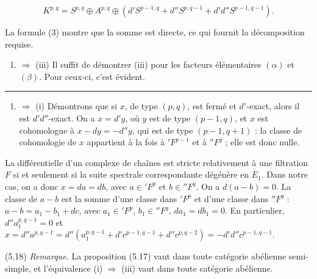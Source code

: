 \documentclass[
  french,
  a3paper,
  a3paper]{extarticle}
\providecommand{\tightlist}{%
  \setlength{\itemsep}{0pt}\setlength{\parskip}{0pt}}
\begin{document}
\[K^{p,q}=S^{p,q}\oplus A^{p,q}\oplus(d'S^{p-1,q}+d''S^{p,q-1}+d'd''S^{p-1,q-1}).\]

La formule (3) montre que la somme est directe, ce qui fournit la
décomposition requise.

\begin{enumerate}
\def\labelenumi{(\roman{enumi})}
\setcounter{enumi}{1}
\tightlist
\item
  \(\Rightarrow\) (iii) Il suffit de démontrer (iii) pour les facteurs
  élémentaires \((\alpha)\) et \((\beta)\). Pour ceux-ci, c'est évident.
\end{enumerate}

\clearpage



\par

\vspace{0.7mm}\hrule\vspace{1.6mm}

\fontsize{9}{11}\selectfont

\begin{enumerate}
\def\labelenumi{(\roman{enumi})}
\setcounter{enumi}{2}
\tightlist
\item
  \(\Rightarrow\) (i) Démontrons que si \(x\), de type \((p,q)\), est
  fermé et \(d'\)-exact, alors il est \(d'd''\)-exact. On a \(x=d'y\),
  où \(y\) est de type \((p-1,q)\), et \(x\) est cohomologue à
  \(x-dy=-d''y\), qui est de type \((p-1,q+1)\) : la classe de
  cohomologie de \(x\) appartient à la fois à \({}'F^{p-1}\) et à
  \({}''F^q\) ; elle est donc nulle.
\end{enumerate}

La différentielle d'un complexe de chaînes est stricte relativement à
une filtration \(F\) si et seulement si la suite spectrale
correspondante dégénère en \(E_1\). Dans notre cas, on a donc
\(x=da=db\), avec \(a\in{}'F^p\) et \(b\in{}''F^q\). On a \(d(a-b)=0\).
La classe de \(a-b\) est la somme d'une classe dans \({}'F^p\) et d'une
classe dans \({}''F^q\) : \(a-b=a_1-b_1+dc\), avec \(a_1\in{}'F^p\),
\(b_1\in{}''F^q\), \(da_1=db_1=0\). En particulier, \(d''a_1^{p,q-1}=0\)
et
\(x=d''a^{p,q-1}=d''(a_1^{p,q-1}+d'c^{p-1,q-1}+d''c^{p,q-2})=-d'd''c^{p-1,q-1}\).

(5.18) \emph{Remarque.} La proposition (5.17) vaut dans toute catégorie
abélienne semi-simple, et l'équivalence (i) \(\Rightarrow\) (iii) vaut
dans toute catégorie abélienne.
\end{document}
